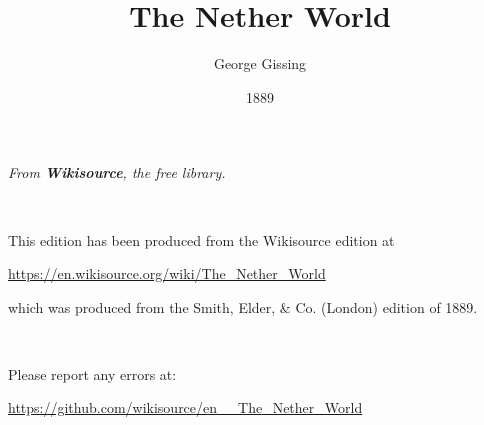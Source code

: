 \documentclass[paper=6in:9in,pagesize=pdftex,headinclude=on,footinclude=on,12pt]{memoir}
\title{The Nether World}
\author{George Gissing}
\date{1889}
\begin{document}
\maketitle

\clearpage
\begin{vplace}
\begin{center}
\small
\emph{From \textbf{Wikisource}, the free library.}

~

This edition has been produced from the Wikisource edition at

\url{https://en.wikisource.org/wiki/The_Nether_World}

which was produced from the Smith, Elder, \& Co. (London) edition of 1889.

~

Please report any errors at:

\url{https://github.com/wikisource/en__The_Nether_World}

\end{center}
\end{vplace}

\frontmatter

\tableofcontents

\mainmatter
\end{document}
